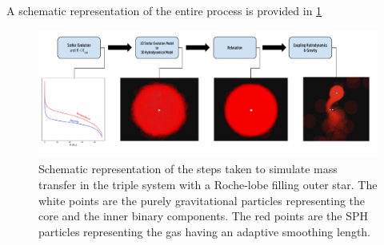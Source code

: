 A schematic representation of the entire process is provided in \cref{fig:schematic_method}

\begin{figure}[htp]
    \centering
    \includegraphics[width=\textwidth]{Thesis/graphs/method_schematic.pdf}
    \caption{Schematic representation of the steps taken to simulate mass transfer in the triple system with a Roche-lobe filling outer star. The white points are the purely gravitational particles representing the core and the inner binary components. The red points are the SPH particles representing the gas having an adaptive smoothing length.}
    \label{fig:schematic_method}
\end{figure}



